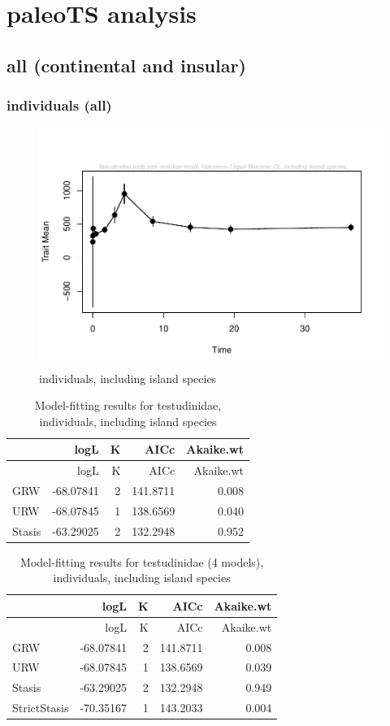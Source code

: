\documentclass[]{article}
\begin{document}
\newpage

\section{paleoTS analysis}\label{paleots-analysis}

\subsection{all (continental and
insular)}\label{all-continental-and-insular}

\subsubsection{individuals (all)}\label{individuals-all}

\begin{figure}[htbp]
\centering
\includegraphics{MA_JJ_files/figure-latex/paleoTS plot-1.pdf}
\caption{individuals, including island species}
\end{figure}

\begin{longtable}[]{@{}lrrrr@{}}
\caption{Model-fitting results for testudinidae, individuals, including
island species}\tabularnewline
\toprule
& logL & K & AICc & Akaike.wt\tabularnewline
\midrule
\endfirsthead
\toprule
& logL & K & AICc & Akaike.wt\tabularnewline
\midrule
\endhead
GRW & -68.07841 & 2 & 141.8711 & 0.008\tabularnewline
URW & -68.07845 & 1 & 138.6569 & 0.040\tabularnewline
Stasis & -63.29025 & 2 & 132.2948 & 0.952\tabularnewline
\bottomrule
\end{longtable}

\begin{longtable}[]{@{}lrrrr@{}}
\caption{Model-fitting results for testudinidae (4 models), individuals,
including island species}\tabularnewline
\toprule
& logL & K & AICc & Akaike.wt\tabularnewline
\midrule
\endfirsthead
\toprule
& logL & K & AICc & Akaike.wt\tabularnewline
\midrule
\endhead
GRW & -68.07841 & 2 & 141.8711 & 0.008\tabularnewline
URW & -68.07845 & 1 & 138.6569 & 0.039\tabularnewline
Stasis & -63.29025 & 2 & 132.2948 & 0.949\tabularnewline
StrictStasis & -70.35167 & 1 & 143.2033 & 0.004\tabularnewline
\bottomrule
\end{longtable}
\end{document}
